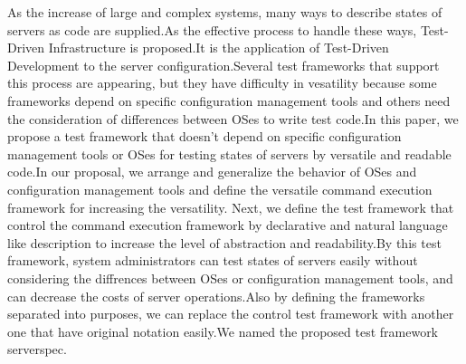 \begin{eabstract}
As the increase of large and complex systems, many ways to describe states of servers as code are supplied.As the effective process to handle these ways, Test-Driven Infrastructure is proposed.It is the application of Test-Driven Development to the server configuration.Several test frameworks that support this process are appearing, but they have difficulty in vesatility because some frameworks depend on specific configuration management tools and others need the consideration of differences between OSes to write test code.In this paper, we propose a test framework that doesn't depend on specific configuration management tools or OSes for testing states of servers by versatile and readable code.In our proposal, we arrange and generalize the behavior of OSes and configuration management tools and define the versatile command execution framework for increasing the versatility. Next, we define the test framework that control the command execution framework by declarative and natural language like description to increase the level of abstraction and readability.By this test framework, system administrators can test states of servers easily without considering the diffrences between OSes or configuration management tools, and can decrease the costs of server operations.Also by defining the frameworks separated into purposes, we can replace the control test framework with another one that have original notation easily.We named the proposed test framework serverspec.
\end{eabstract}
